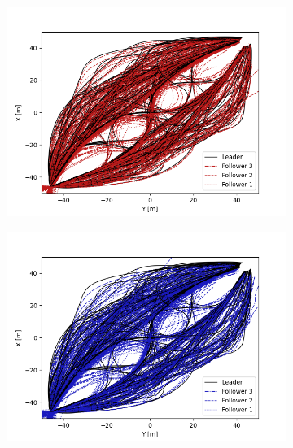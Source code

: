 \documentclass[12pt,twocolumn]{article}
\begin{document}


\begin{figure}
    \centering
    \begin{subfigure}{0.33\textwidth}
        \includegraphics[width=\linewidth]{Figs/StatisticalAnalysis/1L_3F_rigid_128_pos_v5.png}
        \caption{} \label{fig:rigid13pos}
    \end{subfigure}%
    \begin{subfigure}{0.33\textwidth}
        \includegraphics[width=\linewidth]{Figs/StatisticalAnalysis/1L_3F_hard_128_pos_v5.png}

\end{subfigure}
\end{figure}
\end{document}

